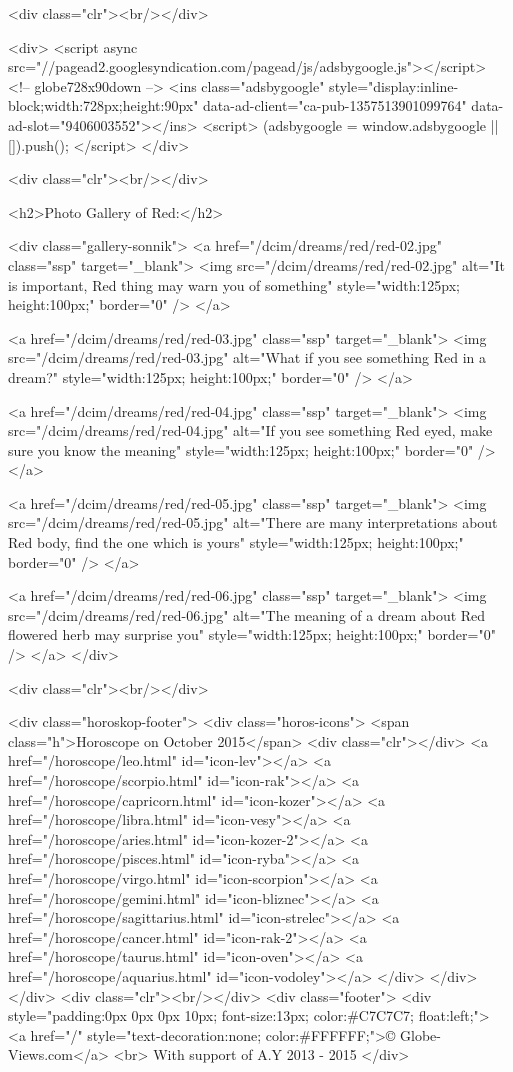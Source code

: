 		<div class="clr"><br/></div>

		<div>
			<script async src="//pagead2.googlesyndication.com/pagead/js/adsbygoogle.js"></script>
			<!-- globe728x90down -->
			<ins class="adsbygoogle"
			     style="display:inline-block;width:728px;height:90px"
			     data-ad-client="ca-pub-1357513901099764"
			     data-ad-slot="9406003552"></ins>
			<script>
			(adsbygoogle = window.adsbygoogle || []).push({});
			</script>
		</div>

				<div class="clr"><br/></div>

		<h2>Photo Gallery of Red:</h2>

		<div class="gallery-sonnik">
						<a href="/dcim/dreams/red/red-02.jpg" class="ssp" target="_blank">
				<img src="/dcim/dreams/red/red-02.jpg" alt="It is important, Red thing may warn you of something" style="width:125px; height:100px;" border="0" />
			</a>

						<a href="/dcim/dreams/red/red-03.jpg" class="ssp" target="_blank">
				<img src="/dcim/dreams/red/red-03.jpg" alt="What if you see something Red in a dream?" style="width:125px; height:100px;" border="0" />
			</a>

						<a href="/dcim/dreams/red/red-04.jpg" class="ssp" target="_blank">
				<img src="/dcim/dreams/red/red-04.jpg" alt="If you see something Red eyed, make sure you know the meaning" style="width:125px; height:100px;" border="0" />
			</a>

						<a href="/dcim/dreams/red/red-05.jpg" class="ssp" target="_blank">
				<img src="/dcim/dreams/red/red-05.jpg" alt="There are many interpretations about Red body, find the one which is yours" style="width:125px; height:100px;" border="0" />
			</a>

						<a href="/dcim/dreams/red/red-06.jpg" class="ssp" target="_blank">
				<img src="/dcim/dreams/red/red-06.jpg" alt="The meaning of a dream about Red flowered herb may surprise you" style="width:125px; height:100px;" border="0" />
			</a>
		</div>
		
		<div class="clr"><br/></div>

		<div class="horoskop-footer">
			<div class="horos-icons">
				<span class="h">Horoscope on October 2015</span>
				<div class="clr"></div>
				<a href="/horoscope/leo.html" id="icon-lev"></a>
				<a href="/horoscope/scorpio.html" id="icon-rak"></a>
				<a href="/horoscope/capricorn.html" id="icon-kozer"></a>
				<a href="/horoscope/libra.html" id="icon-vesy"></a>
				<a href="/horoscope/aries.html" id="icon-kozer-2"></a>
				<a href="/horoscope/pisces.html" id="icon-ryba"></a>
				<a href="/horoscope/virgo.html" id="icon-scorpion"></a>
				<a href="/horoscope/gemini.html" id="icon-bliznec"></a>
				<a href="/horoscope/sagittarius.html" id="icon-strelec"></a>
				<a href="/horoscope/cancer.html" id="icon-rak-2"></a>
				<a href="/horoscope/taurus.html" id="icon-oven"></a>
				<a href="/horoscope/aquarius.html" id="icon-vodoley"></a>
			</div>
		</div>
	</div>
	<div class="clr"><br/></div>
	<div class="footer">
		<div style="padding:0px 0px 0px 10px; font-size:13px; color:#C7C7C7; float:left;">
			<a href="/" style="text-decoration:none; color:#FFFFFF;">© Globe-Views.com</a>
			<br> With support of A.Y 2013 - 2015
		</div>

